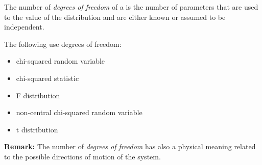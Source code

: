 \documentclass[12pt]{article}
\begin{document}

The number of \emph{degrees of freedom} of a  is the number of parameters that are used to  the value of the distribution and are either known or assumed to be independent.

The following use degrees of freedom:

\begin{itemize}
\item chi-squared random variable
\item chi-squared statistic
\item F distribution
\item non-central chi-squared random variable
\item t distribution
\end{itemize}

{\bf Remark:}
The number of \emph{degrees of freedom} has also a physical meaning
related to the possible directions of motion of the system.
\end{document}

